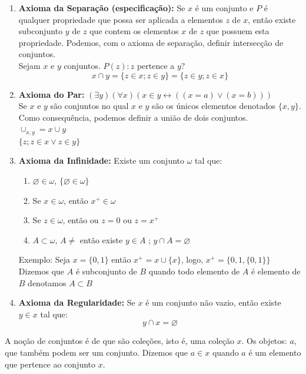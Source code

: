 \documentclass[oneside,a4paper,12pt]{article}
\begin{document}
\begin{enumerate}
	\item \textbf{Axioma da Separação (especificação): } Se $x$ é um conjunto e $P$ é qualquer propriedade que possa ser aplicada a elementos $z$ de $x$, então existe subconjunto $y$ de $z$ que contem os elementos $x$ de $z$ que possuem esta propriedade. Podemos, com o axioma de separação, definir intersecção de conjuntos.
	\\ Sejam $x$ e $y$ conjuntos. $P(z) : z$ pertence a $y$?
	\\ $$x \cap y = \{ z \in x; z \in y\} = \{ z \in y ; z \in x \}$$
	
	\item \textbf{Axioma do Par: } $(\exists y)(\forall x)(x \in y \leftrightarrow ((x = a) \lor (x = b)))$ \\ Se $x$ e $y$ são conjuntos no qual $x$ e $y$ são os únicos elementos denotados $\{ x, y \}$. \\ Como consequência, podemos definir a união de dois conjuntos.
	\\ $\cup_{x,y} = x \cup y$
	\\ $\{ z; z \in x \lor z \in y \}$
	
	\item \textbf{Axioma da Infinidade: } Existe um conjunto $\omega$ tal que:
	\begin{enumerate}
		\item $\varnothing \in \omega$, $\{ \varnothing \in \omega \}$
		\item Se $x \in \omega$, então $x^{+} \in \omega$
		\item Se $z \in \omega$, então ou $z = 0$ ou $z = x^{+}$
		\item $A \subset \omega$, $A \neq$ então existe $y \in A$ ; $y \cap A = \varnothing$
	\end{enumerate}
	Exemplo: Seja $x = \{0,1\}$ então $x^{+} = x \cup \{x\}$, logo, $x^{+} = \{ 0,1,\{0,1\} \}$
	\\ Dizemos que $A$ é subconjunto de $B$ quando todo elemento de $A$ é elemento de $B$ denotamos $A \subset B$
	
	\item \textbf{Axioma da Regularidade: } Se $x$ é um conjunto não vazio, então existe $y \in x$ tal que: $$y \cap x = \varnothing$$
\end{enumerate}

A noção de conjuntos é de que são coleções, isto é, uma coleção $x$. Os objetos: $a$, que também podem ser um conjunto. Dizemos que $a \in x$ quando $a$ é um elemento que pertence ao conjunto $x$.
\end{document}
